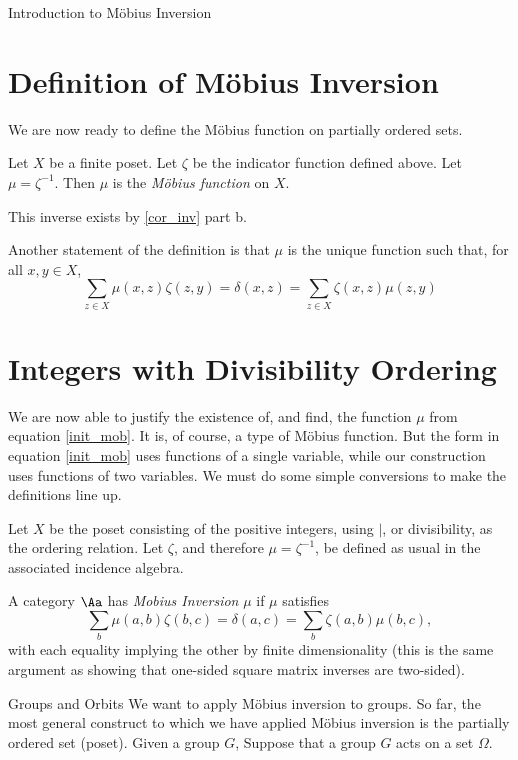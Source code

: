 \documentclass[12pt]{pom_thesis}
\begin{document}
\begin{chapter}{Introduction to M\"obius Inversion}
\section{Definition of M\"obius Inversion}
We are now ready to define the M\"obius function on partially ordered sets.
\begin{defn}\label{def_mob_pos}
Let $X$ be a finite poset. Let $\zeta$ be the indicator function defined above. Let $\mu = \zeta^{-1}$. Then $\mu$ is the \emph{M\"obius function} on $X$.
\end{defn}
\begin{rmk}
This inverse exists by \ref{cor_inv} part b. 
\end{rmk}
\begin{rmk}
Another statement of the definition is that $\mu$ is the unique function such that, for all $x,y \in X$,
\[
\sum_{z \in X} \mu(x,z)\zeta(z,y) = \delta(x,z) = \sum_{z \in X} \zeta(x,z)\mu(z,y)
\]
\end{rmk}
\section{Integers with Divisibility Ordering}
We are now able to justify the existence of, and find, the function $\mu$ from equation \ref{init_mob}. It is, of course, a type of M\"obius function. But the form in equation \ref{init_mob} uses functions of a single variable, while our construction uses functions of two variables. We must do some simple conversions to make the definitions line up.

Let $X$ be the poset consisting of the positive integers, using $|$, or divisibility, as the ordering relation. Let $\zeta$, and therefore $\mu = \zeta^{-1}$, be defined as usual in the associated incidence algebra.
\end{chapter}
\begin{defn}
A category $\Aa$ has \emph{Mobius Inversion} $\mu$ if $\mu$ satisfies
\[
\sum_b \mu(a,b)\zeta(b,c) = \delta(a,c) = \sum_b \zeta(a,b)\mu(b,c),
\]
with each equality implying the other by finite dimensionality (this is the same argument as showing that one-sided square matrix inverses are two-sided).
\end{defn}
\begin{chapter}{Groups and Orbits} 
We want to apply M\"obius inversion to groups. So far, the most general construct to which we have applied M\"obius inversion is the partially ordered set (poset). Given a group $G$, 
Suppose that a group $G$ acts on a set $\Omega$. 
\end{chapter}
\end{document}
